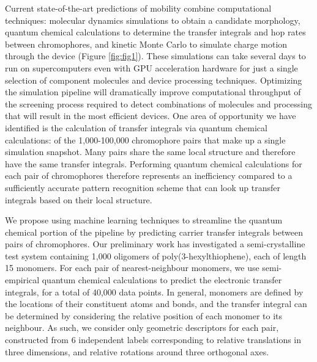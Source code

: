 \documentclass[12pt]{article}
\begin{document}
Current state-of-the-art predictions of mobility combine computational techniques: molecular dynamics simulations to obtain a candidate morphology, quantum chemical calculations to determine the transfer integrals and hop rates between chromophores, and kinetic Monte Carlo to simulate charge motion through the device (Figure \ref{fig:fig1})\cite{MorphCT,Jones2016,Jones2017}.
These simulations can take several days to run on supercomputers even with GPU acceleration hardware for just a single selection of component molecules and device processing techniques.
Optimizing the simulation pipeline will dramatically improve computational throughput of the screening process required to detect combinations of molecules and processing that will result in the most efficient devices.
One area of opportunity we have identified is the calculation of transfer integrals via quantum chemical calculations: of the 1,000-100,000 chromophore pairs that make up a single simulation snapshot.
Many pairs share the same local structure and therefore have the same transfer integrals.
Performing quantum chemical calculations for each pair of chromophores therefore represents an inefficiency compared to a sufficiently accurate pattern recognition scheme that can look up transfer integrals based on their local structure.

We propose using machine learning techniques to streamline the quantum chemical portion of the pipeline by predicting carrier transfer integrals between pairs of chromophores.
Our preliminary work has investigated a semi-crystalline test system containing 1,000 oligomers of poly(3-hexylthiophene), each of length 15 monomers.
For each pair of nearest-neighbour monomers, we use semi-empirical quantum chemical calculations to predict the electronic transfer integrals, for a total of 40,000 data points.
In general, monomers are defined by the locations of their constituent atoms and bonds, and the transfer integral can be determined by considering the relative position of each monomer to its neighbour.
As such, we consider only geometric descriptors for each pair, constructed from 6 independent labels corresponding to relative translations in three dimensions, and relative rotations around three orthogonal axes.
\end{document}
